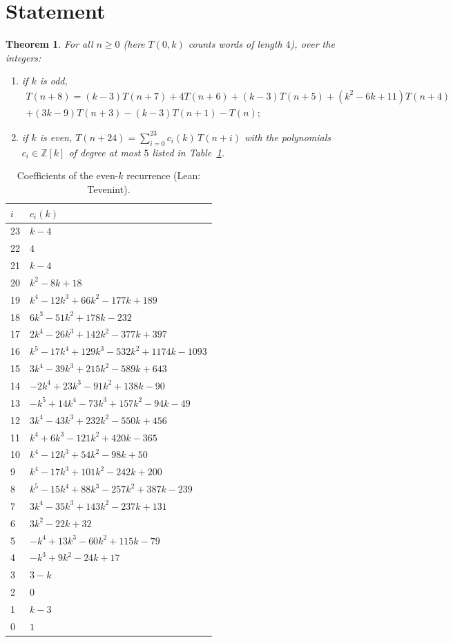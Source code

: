 \documentclass[11pt]{article}
\newtheorem{theorem}{Theorem}
\theoremstyle{remark}\newtheorem{remark}[theorem]{Remark}
\newcommand{\lean}[1]{{\ttfamily\def\_{\textunderscore\allowbreak}#1}}
\begin{document}
\section{Statement}
\begin{theorem}\label{thm:main}
For all $n\ge0$ (here $T(0,k)$ counts words of length $4$), over the integers:
\begin{enumerate}
\item if $k$ is odd,
\begin{multline*}
T(n+8)=(k-3)T(n+7)+4T(n+6)+(k-3)T(n+5)+(k^2-6k+11)T(n+4)\\+(3k-9)T(n+3)-(k-3)T(n+1)-T(n);
\end{multline*}
\item if $k$ is even, $T(n+24)=\sum_{i=0}^{23}c_i(k)\,T(n+i)$ with the polynomials $c_i\in\mathbb Z[k]$ of degree at most $5$ listed in Table~\ref{tab:even}.
\end{enumerate}
\end{theorem}
\begin{table}[ht]\centering\small
\begin{tabular}{@{}ll@{}}\toprule $i$ & $c_i(k)$\\\midrule
23 & $k-4$\\ 22 & $4$\\ 21 & $k-4$\\ 20 & $k^2-8k+18$\\
19 & $k^4-12k^3+66k^2-177k+189$\\ 18 & $6k^3-51k^2+178k-232$\\
17 & $2k^4-26k^3+142k^2-377k+397$\\ 16 & $k^5-17k^4+129k^3-532k^2+1174k-1093$\\
15 & $3k^4-39k^3+215k^2-589k+643$\\ 14 & $-2k^4+23k^3-91k^2+138k-90$\\
13 & $-k^5+14k^4-73k^3+157k^2-94k-49$\\ 12 & $3k^4-43k^3+232k^2-550k+456$\\
11 & $k^4+6k^3-121k^2+420k-365$\\ 10 & $k^4-12k^3+54k^2-98k+50$\\
9 & $k^4-17k^3+101k^2-242k+200$\\ 8 & $k^5-15k^4+88k^3-257k^2+387k-239$\\
7 & $3k^4-35k^3+143k^2-237k+131$\\ 6 & $3k^2-22k+32$\\
5 & $-k^4+13k^3-60k^2+115k-79$\\ 4 & $-k^3+9k^2-24k+17$\\
3 & $3-k$\\ 2 & $0$\\ 1 & $k-3$\\ 0 & $1$\\\bottomrule
\end{tabular}
\caption{Coefficients of the even-$k$ recurrence (Lean: \lean{T\_even\_int}).}\label{tab:even}
\end{table}
\end{document}
